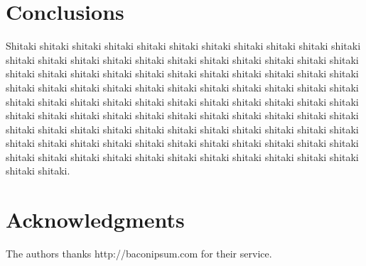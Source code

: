 \documentclass[a4paper,10pt]{article}
\begin{document}
\section{Conclusions}

Shitaki shitaki shitaki shitaki shitaki shitaki shitaki shitaki shitaki shitaki shitaki shitaki shitaki shitaki shitaki shitaki shitaki shitaki shitaki shitaki shitaki shitaki shitaki shitaki shitaki shitaki shitaki shitaki shitaki shitaki shitaki shitaki shitaki shitaki shitaki shitaki shitaki shitaki shitaki shitaki shitaki shitaki shitaki shitaki shitaki shitaki shitaki shitaki shitaki shitaki shitaki shitaki shitaki shitaki shitaki shitaki shitaki shitaki shitaki shitaki shitaki shitaki shitaki shitaki shitaki shitaki shitaki shitaki shitaki shitaki shitaki shitaki shitaki shitaki shitaki shitaki shitaki shitaki shitaki shitaki shitaki shitaki shitaki shitaki shitaki shitaki shitaki shitaki shitaki shitaki shitaki shitaki shitaki shitaki shitaki shitaki shitaki shitaki shitaki shitaki shitaki. 

\section*{Acknowledgments}

The authors thanks http://baconipsum.com for their service.
\end{document}
